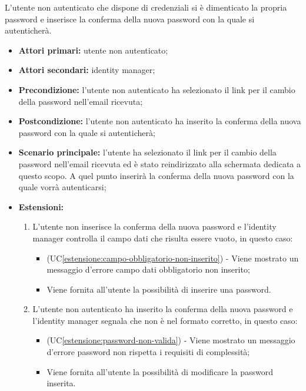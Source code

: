 L'utente non autenticato che dispone di credenziali si è dimenticato la propria password e inserisce la conferma della nuova password con la quale si autenticherà.
\begin{itemize}
	\item \textbf{Attori primari:} utente non autenticato;
	\item \textbf{Attori secondari:} identity manager;
	\item \textbf{Precondizione:} l'utente non autenticato ha selezionato il link per il cambio della password nell'email ricevuta;
	\item \textbf{Postcondizione:} l'utente non autenticato ha inserito la conferma della nuova password con la quale si autenticherà;
	\item \textbf{Scenario principale:} l'utente ha selezionato il link per il cambio della password nell'email ricevuta ed è stato reindirizzato alla schermata dedicata a questo scopo. A quel punto inserirà la conferma della nuova password con la quale vorrà autenticarsi;
	\item \textbf{Estensioni:}
	\begin{enumerate}[label=\lett]
		\item L'utente non inserisce la conferma della nuova password e l'identity manager controlla il campo dati che risulta essere vuoto, in questo caso:
		\begin{itemize}
			\item (UC\ref{estensione:campo-obbligatorio-non-inserito}) - Viene mostrato un messaggio d'errore campo dati obbligatorio non inserito;
			\item Viene fornita all'utente la possibilità di inserire una password.
		\end{itemize}
		\item L'utente non autenticato ha inserito la conferma della nuova password e l'identity manager segnala che non è nel formato corretto, in questo caso:
		\begin{itemize}
			\item (UC\ref{estensione:password-non-valida}) - Viene mostrato un messaggio d'errore password non rispetta i requisiti di complessità;
			\item Viene fornita all'utente la possibilità di modificare la password inserita.
		\end{itemize}
	\end{enumerate}
\end{itemize}


